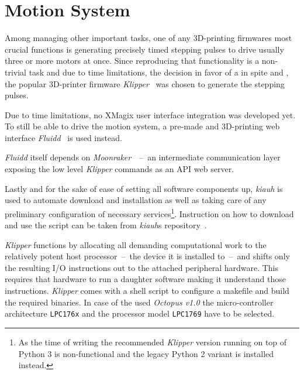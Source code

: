     \section{Motion System}
        Among managing other important tasks, one of any 3D-printing firmwares most crucial functions is generating precisely timed stepping pulses to drive usually three or more motors at once.
        Since reproducing that functionality is a non-trivial task and due to  time limitations, the decision in favor of a in spite  and , the popular 3D-printer firmware \textit{Klipper}~\cite{Software.Klipper.2023} was chosen to generate the stepping pulses.
        
        Due to time limitations, no XMagix user interface integration was developed yet.
        To still be able to drive the motion system, a pre-made and 3D-printing web interface \textit{Fluidd}~\cite{Software.FluiddTheKlipperUI} is used instead.
        
        \textit{Fluidd} itself depends on \textit{Moonraker}~\cite{Software.MoonrakerAPIWebServerForKlipper.2023}~--~an intermediate communication layer exposing the low level \textit{Klipper} commands as an API web server.\par\medskip

        Lastly and for the sake of ease of setting all software components up, \textit{kiauh} is used to automate download and installation as well as taking care of any preliminary configuration of necessary services\footnote{As the time of writing the recommended \textit{Klipper} version running on top of Python 3 is non-functional and the legacy Python 2 variant is installed instead.}. Instruction on how to download and use the script can be taken from \textit{kiauh}s repository~\cite{Software.KlipperInstallationAndUpdateHelper.2023}.\par\medskip

        \textit{Klipper} functions by allocating all demanding computational work to the relatively potent host processor~--~the device it is installed to~--~and shifts only the resulting I/O instructions out to the attached peripheral hardware.
        This requires that hardware to run a daughter software making it understand those instructions.
        \textit{Klipper} comes with a shell script to configure a makefile and build the required binaries.
        In case of the used \textit{Octopus v1.0} the micro-controller architecture \texttt{LPC176x} and the processor model \texttt{LPC1769} have to be selected.

